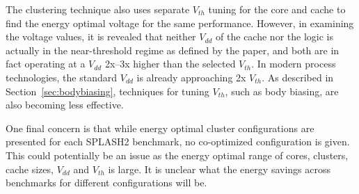 The clustering technique also uses separate $V_{th}$ tuning for the core and cache to find the energy optimal voltage for the same performance.
However, in examining the voltage values, it is revealed that neither $V_{dd}$
of the cache nor the logic is actually in the near-threshold regime as defined
by the paper, and both are in fact operating at a $V_{dd}$ 2x--3x higher than
the selected $V_{th}$. In modern process technologies, the standard $V_{dd}$ is
already approaching 2x $V_{th}$. As described in Section~\ref{sec:bodybiasing},
techniques for tuning $V_{th}$, such as body biasing, are also becoming less effective.

One final concern is that while energy optimal cluster configurations are
presented for each SPLASH2 benchmark, no co-optimized configuration is given.
This could potentially be an issue as the energy optimal range of cores,
clusters, cache sizes, $V_{dd}$ and $V_{th}$ is large. It is unclear what the
energy savings across benchmarks for different configurations will be.

